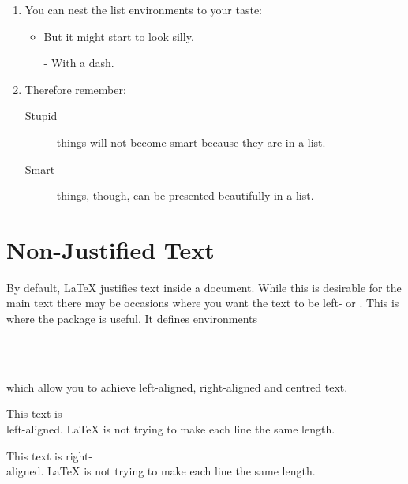 \begin{example}
\begin{enumerate}
\item You can nest the list
environments to your taste:
\begin{itemize}
\item But it might start to
look silly.
\item[-] With a dash.
\end{itemize}
\item Therefore remember:
\begin{description}
\item[Stupid] things will not
become smart because they are
in a list.
\item[Smart] things, though,
can be presented beautifully
in a list.
\end{description}
\end{enumerate}
\end{example}

\section{Non-Justified Text}\label{sec:ragged}

By default, \LaTeX{} justifies text inside a document. While this is desirable
for the main text there may be occasions where you want the text to be left- or
. This is where the 
package is useful. It defines environments
\begin{lscommand}
   \\
   \\
\end{lscommand}
which allow you to achieve left-aligned, right-aligned and centred text.

\begin{example}
\begin{FlushLeft}
  This text is\\ left-aligned.
  \LaTeX{} is not trying to make
  each line the same length.
\end{FlushLeft}
\end{example}

\begin{example}
\begin{FlushRight}
  This text is right-\\aligned.
  \LaTeX{} is not trying to make
  each line the same length.
\end{FlushRight}
\end{example}

